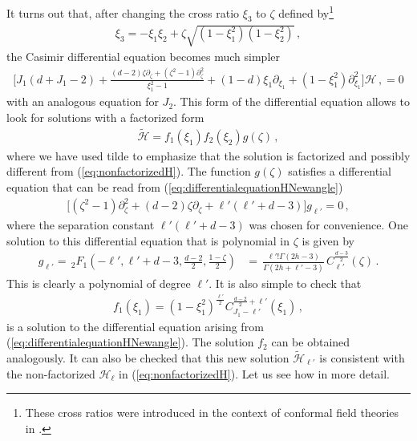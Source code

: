 It turns out that, after changing the cross ratio $\xi_3$ to $\zeta$ defined by\footnote{These cross ratios were introduced in the context of conformal field theories in \cite{Buric:2021kgy}. }
\begin{align}
  \xi_3= -\xi_1\xi_2 +\zeta \sqrt{(1-\xi_1^2)(1-\xi_2^2)}\,,
\end{align}
the Casimir differential equation becomes much simpler
\begin{align}
  \bigg[J_1 \left(d+J_1-2\right) +\frac{(d-2) \zeta \partial_{\zeta}+(\zeta^2-1) \partial_{\zeta}^2 }{\xi _1^2-1}+(1-d) \xi _1\partial_{\xi _1} +(1-\xi _1^2) \partial_{\xi _1}^2 \bigg] \mathcal{H}\,,=0\label{eq:differentialequationHNewangle}
\end{align}
with an analogous equation for $J_2$. This form of the differential equation allows to look for solutions with a factorized form
\begin{align}
  \tilde{\mathcal{H}} = f_1(\xi_1) f_2(\xi_2) g(\zeta) \,,
  \label{eq:factorizePolynomial}
\end{align}
where we have used tilde to emphasize that the solution is factorized and possibly different from (\ref{eq:nonfactorizedH}).
The function $g(\zeta)$ satisfies a differential equation that can be read from (\ref{eq:differentialequationHNewangle})
\begin{align}
  \big[(\zeta^2-1)\partial_{\zeta}^2 +(d-2)\zeta \partial_{\zeta}+\ell' (\ell'+d-3) \big] g_{\ell'} = 0\,,
  \label{eq:ellDiffequation}
\end{align}
where the separation constant $\ell' (\ell'+d-3) $ was chosen for convenience.
One solution to this differential equation that is polynomial in $\zeta$ is given by
\begin{align}
  g_{\ell'}  = \,_2F_1\left(-\ell',\ell'+d-3,\frac{d-2}{2},\frac{1-\zeta}{2}\right)
   & = \,\frac{\ell'!\Gamma(2h-3)}{\Gamma(2h+\ell'-3)} \,C_{\ell'}^{\frac{d-3}{2}}  (\zeta)\,.
\end{align}
This is clearly a polynomial of degree $\ell'$.
It is also simple to check that
\begin{align}
  f_1(\xi_1) = (1-\xi_1^2)^\frac{\ell'}{2} C_{J_1-\ell'}^{\frac{d-2}{2}+\ell'}(\xi_1)\,,
\end{align}
is a solution to the differential equation arising from (\ref{eq:differentialequationHNewangle}). The solution $f_2$ can be obtained analogously.
It can also be checked that this new solution  $ \tilde{\mathcal{H}}_{\ell'}$ is consistent with the non-factorized $\mathcal{H}_\ell$ in (\ref{eq:nonfactorizedH}). Let us see how in more detail.

